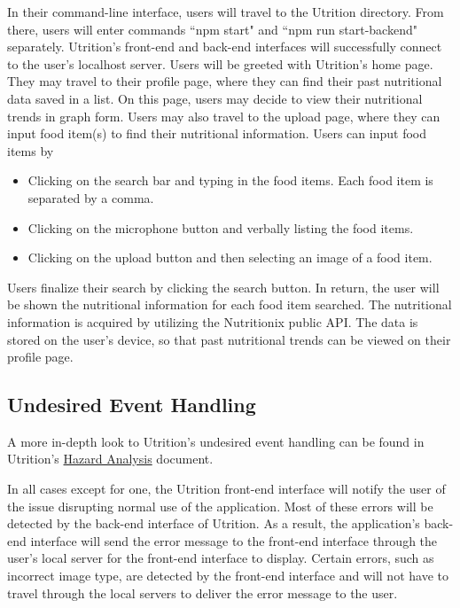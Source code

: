 \documentclass[12pt, titlepage]{article}
\begin{document}
In their command-line interface, users will travel to the Utrition directory. From there, users will enter commands ``npm start" and ``npm run start-backend" separately. Utrition's front-end and back-end interfaces will successfully connect to the user's localhost server. Users will be greeted with Utrition's home page. They may travel to their profile page, where they can find their past nutritional data saved in a list. On this page, users may decide to view their nutritional trends in graph form. Users may also travel to the upload page, where they can input food item(s) to find their nutritional information. Users can input food items by 
\begin{itemize}
	\item Clicking on the search bar and typing in the food items. Each food item is separated by a comma.
	\item Clicking on the microphone button and verbally listing the food items.
	\item Clicking on the upload button and then selecting an image of a food item.
\end{itemize}
Users finalize their search by clicking the search button. In return, the user will be shown the nutritional information for each food item searched. The nutritional information is acquired by utilizing the Nutritionix public API. The data is stored on the user's device, so that past nutritional trends can be viewed on their profile page.

\subsection{Undesired Event Handling}


A more in-depth look to Utrition's undesired event handling can be found in Utrition's \href{../../HazardAnalysis/HazardAnalysis.pdf}{Hazard Analysis} document.

In all cases except for one, the Utrition front-end interface will notify the user of the issue disrupting normal use of the application. Most of these errors will be detected by the back-end interface of Utrition. As a result, the application's back-end interface will send the error message to the front-end interface through the user's local server for the front-end interface to display. Certain errors, such as incorrect image type, are detected by the front-end interface and will not have to travel through the local servers to deliver the error message to the user. 
\end{document}
